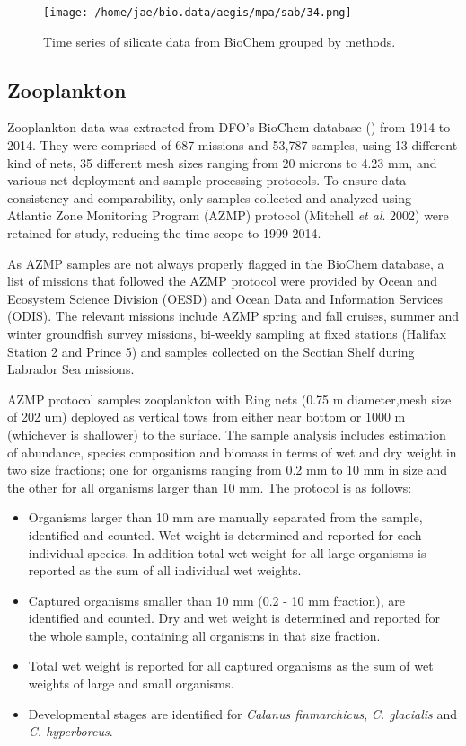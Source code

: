 \documentclass[letterpaper,portrait,11pt]{scrartcl}
\numberwithin{equation}{section}    %
\numberwithin{figure}{section}    %
\numberwithin{table}{section}       %
\begin{document}
\begin{appendices}
\begin{figure}[h]

  \centering
  \texttt{[image: /home/jae/bio.data/aegis/mpa/sab/34.png]}
  \caption{Time series of silicate data from BioChem grouped by methods.}
    \label{fig:silicateTimeseries}
\end{figure}



\afterpage{\clearpage}
\subsection{Zooplankton}

Zooplankton data was extracted from DFO's BioChem database (\cite{DFO:2014:biochem}) from 1914 to 2014. They were comprised of 687 missions and 53,787 samples, using 13 different kind of nets, 35 different mesh sizes ranging from 20 microns to 4.23 mm, and various net deployment and sample processing protocols. To ensure data consistency and comparability, only samples collected and analyzed using Atlantic Zone Monitoring Program (AZMP) protocol (Mitchell \textit{et al}. 2002) were retained for study, reducing the time scope to 1999-2014.

As AZMP samples are not always properly flagged in the BioChem database, a list of missions that followed the AZMP protocol were provided by Ocean and Ecosystem Science Division (OESD) and Ocean Data and Information Services (ODIS). The relevant missions include AZMP spring and fall cruises, summer and winter groundfish survey missions, bi-weekly sampling at fixed stations (Halifax Station 2 and Prince 5) and samples collected on the Scotian Shelf during Labrador Sea missions.

AZMP protocol samples zooplankton with Ring nets (0.75 m diameter,mesh size of 202 um) deployed as vertical tows from either near bottom or 1000 m (whichever is shallower) to the surface. The sample analysis includes estimation of abundance, species composition and biomass in terms of wet and dry weight in two size fractions; one for organisms ranging from 0.2 mm to 10 mm in size and the other for all organisms larger than 10 mm.  The protocol is as follows:

\begin{itemize}
  \item Organisms larger than 10 mm are manually separated from the sample, identified and counted. Wet weight is determined and reported for each individual species. In addition total wet weight for all large organisms is reported as the sum of all individual wet weights.
  \item Captured organisms smaller than 10 mm (0.2 - 10 mm fraction), are identified and counted. Dry and wet weight is determined and reported for the whole sample, containing all organisms in that size fraction.
  \item Total wet weight is reported for all captured organisms as the sum of wet weights of large and small organisms.
  \item Developmental stages are identified for \textit{Calanus finmarchicus}, \textit{C. glacialis} and \textit{C. hyperboreus}.
\end{itemize}



\end{appendices}
\end{document}
